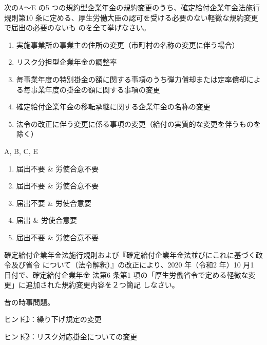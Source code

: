 \begin{truefalse}[年金1 \ 2019 \ 問題1(2)\textcircled{4} \ (改題)]
次のA～E の5 つの規約型企業年金の規約変更のうち、確定給付企業年金法施行規則第10
条に定める、厚生労働大臣の認可を受ける必要のない軽微な規約変更で届出の必要のないも
のを全て挙げなさい。

\begin{enumerate}[A:]
  \item 実施事業所の事業主の住所の変更（市町村の名称の変更に伴う場合）
  \item リスク分担型企業年金の調整率
  \item 毎事業年度の特別掛金の額に関する事項のうち弾力償却または定率償却による毎事業年度の掛金の額に関する事項の変更
  \item 確定給付企業年金の移転承継に関する企業年金の名称の変更
  \item 法令の改正に伴う変更に係る事項の変更（給付の実質的な変更を伴うものを除く）
\end{enumerate}

\end{truefalse}

\begin{answerbox}
 A, B, C, E
\end{answerbox}


\begin{explanationbox}
  \begin{enumerate}[A:]
    \item 届出不要 \& 労使合意不要
    \item 届出不要 \& 労使合意不要
    \item 届出不要 \& 労使合意要
    \item 届出 \qquad  \& 労使合意要
    \item 届出不要 \& 労使合意不要
  \end{enumerate}
\end{explanationbox}


\begin{shortanswer}[年金1 \ 2021 \ 問題2(1)\textcircled{1}]
確定給付企業年金法施行規則および『確定給付企業年金法並びにこれに基づく政令及び省令
について（法令解釈）』の改正により、2020 年（令和2 年）10 月1 日付で、確定給付企業年金
法第6 条第1 項の「厚生労働省令で定める軽微な変更」に追加された規約変更内容を２つ簡記
しなさい。
\end{shortanswer}

\begin{explanationbox}
  昔の時事問題。

  ヒント\textcircled{1}：繰り下げ規定の変更

  ヒント\textcircled{2}：リスク対応掛金についての変更
\end{explanationbox}


